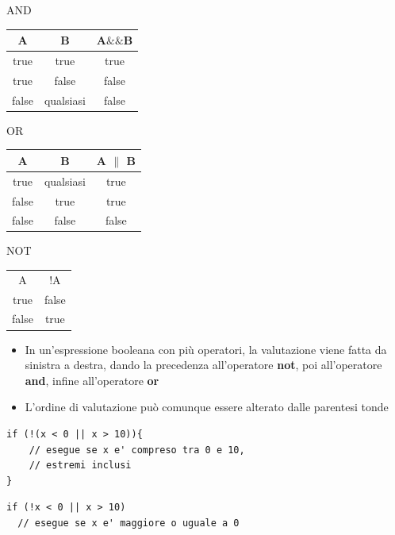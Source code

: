 \begin{frame}
\begin{block}{AND}
\centering
\begin{tabular}{|c|c|c|}
\hline
A & B & A$\&\&$B\\
\hline
true & true & true\\
\hline
true & false & false\\
\hline
false & qualsiasi & false \\
\hline
\end{tabular}
\end{block}

\begin{block}{OR}
\centering
\begin{tabular}{|c|c|c|}
\hline
A & B & A $\|$ B\\
\hline
true & qualsiasi & true\\
\hline
false & true & true\\
\hline
false & false & false \\
\hline
\end{tabular}
\end{block}

\begin{block}{NOT}
\centering
\begin{tabular}{|c|c|}
\hline
A & !A\\
true & false\\
\hline
false & true\\
\hline
\end{tabular}
\end{block}
\end{frame}

\begin{frame}[fragile]
\begin{block}{}
\begin{itemize}
\item In un'espressione booleana con più operatori, la valutazione viene fatta da sinistra a destra, dando la precedenza all'operatore 
\textbf{not}, poi all'operatore \textbf{and}, infine all'operatore \textbf{or}
\item L'ordine di valutazione può comunque essere alterato dalle parentesi tonde
\end{itemize}
\end{block}
\begin{lstlisting}
if (!(x < 0 || x > 10)){
    // esegue se x e' compreso tra 0 e 10,
    // estremi inclusi
}
\end{lstlisting}
\begin{lstlisting}
if (!x < 0 || x > 10)
  // esegue se x e' maggiore o uguale a 0
\end{lstlisting}
\end{frame}

